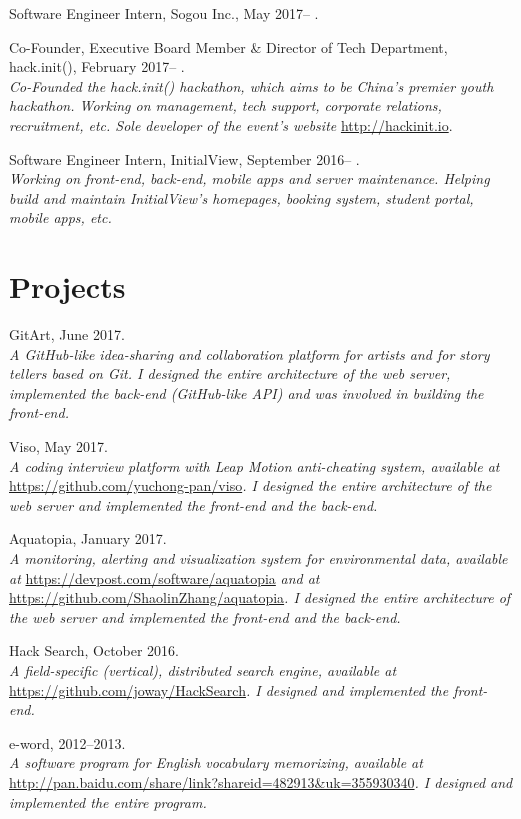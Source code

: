 \documentclass[letterpaper]{article}
\renewenvironment{itemize}{
  \begin{list}{}{
    \setlength{\leftmargin}{1.5em}
  }
}{
  \end{list}
}
\begin{document}
\begin{itemize}
  \item Software Engineer Intern, Sogou Inc., May 2017-- .

  \item Co-Founder, Executive Board Member \& Director of Tech Department, hack.init(), February 2017-- .\\
  \emph{Co-Founded the hack.init() hackathon, which aims to be China's premier youth hackathon. Working on management, tech support, corporate relations, recruitment, etc. Sole developer of the event's website }\url{http://hackinit.io}{.}

  \item Software Engineer Intern, InitialView, September 2016-- .\\
  \emph{Working on front-end, back-end, mobile apps and server maintenance. Helping build and maintain InitialView's homepages, booking system, student portal, mobile apps, etc.}
\end{itemize}


\section*{Projects}

\begin{itemize}
  \item GitArt, June 2017.\\
  \emph{A GitHub-like idea-sharing and collaboration platform for artists and for story tellers based on Git. I designed the entire architecture of the web server, implemented the back-end (GitHub-like API) and was involved in building the front-end.}

  \item Viso, May 2017.\\
  \emph{A coding interview platform with Leap Motion anti-cheating system, available at }\url{https://github.com/yuchong-pan/viso}\emph{. I designed the entire architecture of the web server and implemented the front-end and the back-end.}

  \item Aquatopia, January 2017.\\
  \emph{A monitoring, alerting and visualization system for environmental data, available at }\url{https://devpost.com/software/aquatopia}\emph{ and at }\url{https://github.com/ShaolinZhang/aquatopia}\emph{. I designed the entire architecture of the web server and implemented the front-end and the back-end.}

  \item Hack Search, October 2016.\\
  \emph{A field-specific (vertical), distributed search engine, available at }\url{https://github.com/joway/HackSearch}\emph{. I designed and implemented the front-end.}

  \item e-word, 2012--2013.\\
  \emph{A software program for English vocabulary memorizing, available at }\url{http://pan.baidu.com/share/link?shareid=482913&uk=355930340}\emph{. I designed and implemented the entire program.}

\end{itemize}
\end{document}
